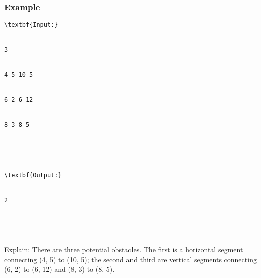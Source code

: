 \subsubsection{   Example  }
\begin{verbatim}
\textbf{Input:}


3 


4 5 10 5 


6 2 6 12 


8 3 8 5 





\textbf{Output:}


2





\end{verbatim}

   Explain:       There are three potential obstacles. The first is a horizontal segment connecting (4, 5) to (10, 5); the second and third are vertical segments connecting (6, 2) to (6, 12) and (8, 3) to (8, 5).   
